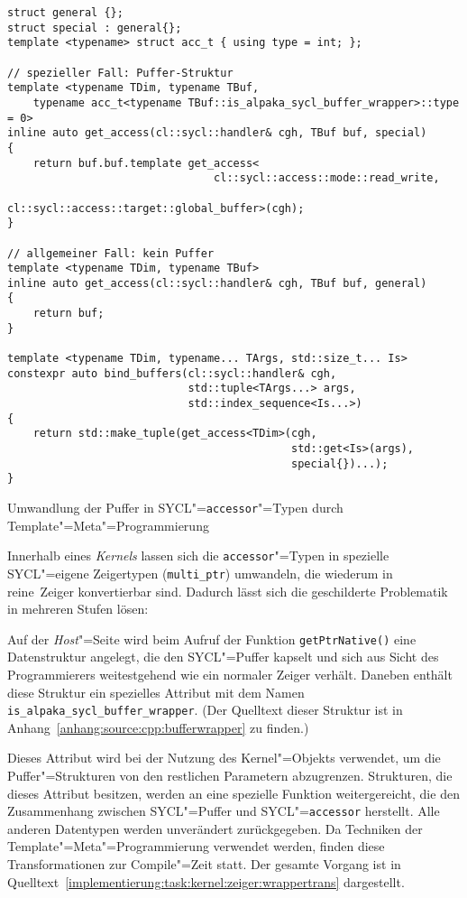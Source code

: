 \begin{code}
    \begin{verbatim}
struct general {};
struct special : general{};
template <typename> struct acc_t { using type = int; };

// spezieller Fall: Puffer-Struktur
template <typename TDim, typename TBuf,
    typename acc_t<typename TBuf::is_alpaka_sycl_buffer_wrapper>::type = 0>
inline auto get_access(cl::sycl::handler& cgh, TBuf buf, special)
{
    return buf.buf.template get_access<
                                cl::sycl::access::mode::read_write,
                                cl::sycl::access::target::global_buffer>(cgh);
}

// allgemeiner Fall: kein Puffer
template <typename TDim, typename TBuf>
inline auto get_access(cl::sycl::handler& cgh, TBuf buf, general)
{
    return buf;
}

template <typename TDim, typename... TArgs, std::size_t... Is>
constexpr auto bind_buffers(cl::sycl::handler& cgh,
                            std::tuple<TArgs...> args,
                            std::index_sequence<Is...>)
{
    return std::make_tuple(get_access<TDim>(cgh,
                                            std::get<Is>(args),
                                            special{})...);
}
    \end{verbatim}
    \caption{Umwandlung der Puffer in SYCL"=\texttt{accessor}"=Typen durch
             Template"=Meta"=Programmierung}
    \label{implementierung:task:kernel:zeiger:wrappertrans}
\end{code}
\vspace{3mm}
Innerhalb eines \textit{Kernels} lassen sich die \texttt{accessor}"=Typen in spezielle
SYCL"=eigene Zeigertypen (\texttt{multi\_ptr}) umwandeln, die wiederum in
\glqq reine\grqq\ Zeiger konvertierbar sind. Dadurch lässt sich die geschilderte
Problematik in mehreren Stufen lösen:

Auf der \textit{Host}"=Seite wird beim Aufruf der Funktion
\texttt{getPtrNative()} eine Datenstruktur angelegt, die den SYCL"=Puffer
kapselt und sich aus Sicht des Programmierers weitestgehend wie ein normaler
Zeiger verhält. Daneben enthält diese Struktur ein spezielles Attribut mit dem
Namen \texttt{is\_alpaka\_sycl\_buffer\_wrapper}. (Der Quelltext dieser Struktur
ist in Anhang~\ref{anhang:source:cpp:bufferwrapper} zu finden.)

Dieses Attribut wird bei der Nutzung des Kernel"=Objekts verwendet, um die
Puffer"=Strukturen von den restlichen Parametern abzugrenzen. Strukturen, die
dieses Attribut besitzen, werden an eine spezielle Funktion weitergereicht, die
den Zusammenhang zwischen SYCL"=Puffer und SYCL"=\texttt{accessor} herstellt.
Alle anderen Datentypen werden unverändert zurückgegeben. Da Techniken der
Template"=Meta"=Programmierung verwendet werden, finden diese Transformationen
zur Compile"=Zeit statt. Der gesamte Vorgang ist in
Quelltext~\ref{implementierung:task:kernel:zeiger:wrappertrans} dargestellt.

